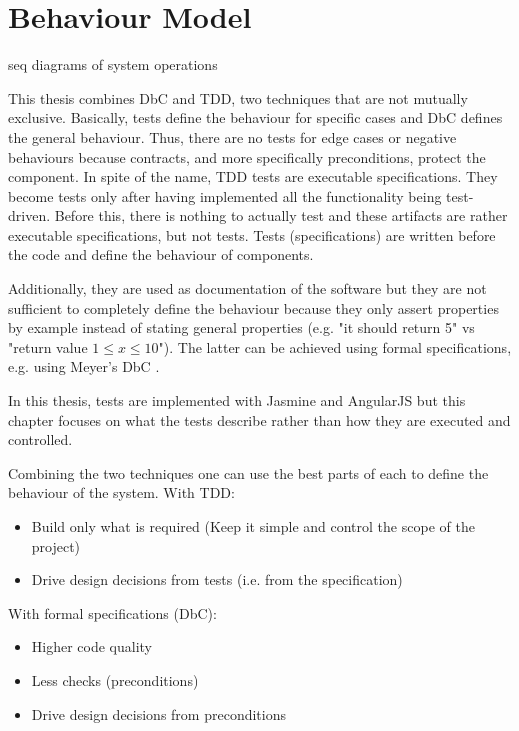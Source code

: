 \FloatBarrier

\section{Behaviour Model}
seq diagrams of system operations

This thesis combines \ac{DbC} and \ac{TDD}, two techniques that are not mutually exclusive.
Basically, tests define the behaviour for specific cases and \ac{DbC} defines the general behaviour. 
Thus, there are no tests for edge cases or negative behaviours because contracts, and more specifically preconditions, protect the component.
In spite of the name, \ac{TDD} tests are executable specifications.
They become tests only after having implemented all the functionality being test-driven.
Before this, there is nothing to actually test and these artifacts are rather executable specifications, but not tests.
Tests (specifications) are written before the code and define the behaviour of components.

Additionally, they are used as documentation of the software but they are not sufficient to completely define the behaviour because they only assert properties by example instead of stating general properties (e.g. "it should return 5" vs "return value $1 \leq x \leq 10$"). The latter can be achieved using formal specifications,
e.g. using Meyer's \ac{DbC} \cite{Baumeister:2004}.

In this thesis, tests are implemented with Jasmine and AngularJS but this chapter focuses on what the tests describe rather than how they are executed and controlled.

Combining the two techniques one can use the best parts of each to define the behaviour of the system.
With \ac{TDD}:
\begin{itemize}
    \item Build only what is required (Keep it simple and control the scope of the project)
    \item Drive design decisions from tests (i.e. from the specification)
\end{itemize}

With formal specifications (\ac{DbC}):
\begin{itemize}
    \item Higher code quality
    \item Less checks (preconditions)
    \item Drive design decisions from preconditions
\end{itemize}


